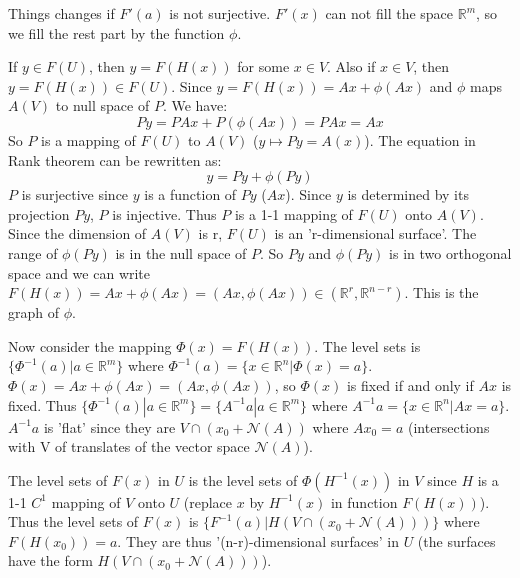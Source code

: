 Things changes if $F'(a)$ is not surjective. $F'(x)$ can not fill the space $\mathbb{R}^m$, so we fill the rest part by the function $\phi$.\par
\begin{remark}
    If $y\in F(U)$, then $y=F(H(x))$ for some $x\in V$. Also if $x\in V$, then $y=F(H(x))\in F(U)$. Since $y=F(H(x))=Ax+\phi(Ax)$ and $\phi$ maps $A(V)$ to null space of $P$. We have:
    \begin{equation*}
        Py=PAx+P(\phi(Ax))=PAx=Ax
    \end{equation*}
    So $P$ is a mapping of $F(U)$ to $A(V)$ ($y\mapsto Py=A(x)$). The equation in Rank theorem can be rewritten as:
    \begin{equation*}
        y=Py+\phi(Py)
    \end{equation*}
    $P$ is surjective since $y$ is a function of $Py$ ($Ax$). Since $y$ is determined by its projection $Py$, $P$ is injective. Thus $P$ is a 1-1 mapping of $F(U)$ onto $A(V)$. Since the dimension of $A(V)$ is r, $F(U)$ is an 'r-dimensional surface'. The range of $\phi(Py)$ is in the null space of $P$. So $Py$ and $\phi(Py)$ is in two orthogonal space and we can write $F(H(x))=Ax+\phi(Ax)=(Ax,\phi(Ax))\in (\mathbb{R}^r,\mathbb{R}^{n-r})$. This is the graph of $\phi$.\par
    Now consider the mapping $\Phi(x)=F(H(x))$. The level sets is $\{\Phi^{-1}(a)|a\in \mathbb{R}^m\}$ where $\Phi^{-1}(a)=\{x\in \mathbb{R}^n|\Phi(x)=a\}$. $\Phi(x)=Ax+\phi(Ax)=(Ax,\phi(Ax))$, so $\Phi(x)$ is fixed if and only if $Ax$ is fixed. Thus $\{\Phi^{-1}(a)|a\in \mathbb{R}^m\}=\{A^{-1}a|a\in \mathbb{R}^m\}$
    where $A^{-1}a=\{x\in \mathbb{R}^n|Ax=a\}$. $A^{-1}a$ is 'flat' since they are $V\cap (x_0+\mathscr{N}(A))$ where $Ax_0=a$ (intersections with V of translates of the vector space $\mathscr{N}(A)$).\par
    The level sets of $F(x)$ in $U$ is the level sets of $\Phi(H^{-1}(x))$ in $V$ since $H$ is a 1-1 $C^1$ mapping of $V$ onto $U$ (replace $x$ by $H^{-1}(x)$ in function $F(H(x))$). Thus the level sets of $F(x)$ is $\{F^{-1}(a)| H(V\cap (x_0+\mathscr{N}(A)))\}$ where $F(H(x_0))=a$. They are thus '(n-r)-dimensional surfaces' in $U$ (the surfaces have the form $H(V\cap (x_0+\mathscr{N}(A)))$).
\end{remark}
